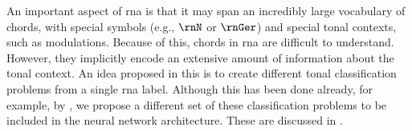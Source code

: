 
An important aspect of \gls{rna} is that it may span an
incredibly large vocabulary of chords, with special symbols
(e.g., $\rnN$ or $\rnGer$) and special tonal contexts, such
as modulations. Because of this, chords in \gls{rna} are
difficult to understand. However, they implicitly encode an
extensive amount of information about the tonal context. An
idea proposed in this \thesisdiss{} is to create different
tonal classification problems from a single \gls{rna} label.
Although this has been done already, for example, by
\textcite{chen2018functional}, we propose a different set of
these classification problems to be included in the neural
network architecture. These are discussed in
.

